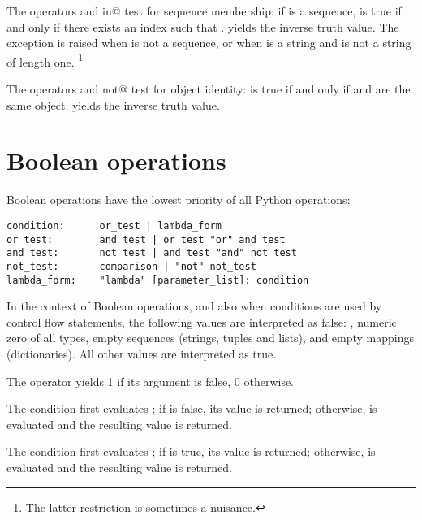 The operators \verb@in@ and \verb@not in@ test for sequence
membership: if  is a sequence,  is
true if and only if there exists an index  such that
.
 yields the inverse truth value.  The
exception \verb@TypeError@ is raised when  is not a sequence,
or when  is a string and  is not a string of length one.%
\footnote{The latter restriction is sometimes a nuisance.}

The operators \verb@is@ and \verb@is not@ test for object identity:
   is true if and only if  and 
are the same object.     yields the inverse
truth value.

\section{Boolean operations} \label{Booleans}

Boolean operations have the lowest priority of all Python operations:

\begin{verbatim}
condition:      or_test | lambda_form
or_test:        and_test | or_test "or" and_test
and_test:       not_test | and_test "and" not_test
not_test:       comparison | "not" not_test
lambda_form:	"lambda" [parameter_list]: condition
\end{verbatim}

In the context of Boolean operations, and also when conditions are
used by control flow statements, the following values are interpreted
as false: \verb@None@, numeric zero of all types, empty sequences
(strings, tuples and lists), and empty mappings (dictionaries).  All
other values are interpreted as true.

The operator \verb@not@ yields 1 if its argument is false, 0 otherwise.

The condition  \verb@and@ {} first evaluates ; if
 is false, its value is returned; otherwise,  is
evaluated and the resulting value is returned.

The condition  \verb@or@ {} first evaluates ; if
 is true, its value is returned; otherwise,  is
evaluated and the resulting value is returned.

